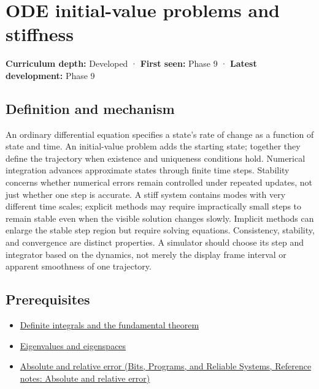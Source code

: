 \hypertarget{appendix-e8ab9836882e}{}\label{referencestart:appendix-e8ab9836882e}
\section{ODE initial-value problems and stiffness}\label{appendix-e8ab9836882e-ode-initial-value-problems-and-stiffness}

\textbf{Curriculum depth:} Developed · \textbf{First seen:} Phase 9 · \textbf{Latest development:} Phase 9

\begin{allmightroledefinition}

\subsection{Definition and mechanism}\label{appendix-e8ab9836882e-definition-and-mechanism}

An ordinary differential equation specifies a state's rate of change as a function of state and time. An initial-value problem adds the starting state; together they define the trajectory when existence and uniqueness conditions hold. Numerical integration advances approximate states through finite time steps. Stability concerns whether numerical errors remain controlled under repeated updates, not just whether one step is accurate. A stiff system contains modes with very different time scales; explicit methods may require impractically small steps to remain stable even when the visible solution changes slowly. Implicit methods can enlarge the stable step region but require solving equations. Consistency, stability, and convergence are distinct properties. A simulator should choose its step and integrator based on the dynamics, not merely the display frame interval or apparent smoothness of one trajectory.

\end{allmightroledefinition}

\subsection{Prerequisites}\label{appendix-e8ab9836882e-prerequisites}

\begin{itemize}
\tightlist
\item
  \hyperref[appendix-1a50e72435c2]{Definite integrals and the fundamental theorem}
\item
  \hyperref[appendix-0b3be18411f9]{Eigenvalues and eigenspaces}
\item
  \href{../01-Bits-Programs-and-Reliable-Systems/main.pdf\#nameddest=appendix-3ae74e89b4e6}{Absolute and relative error (Bits, Programs, and Reliable Systems, Reference notes: Absolute and relative error)}
\end{itemize}

